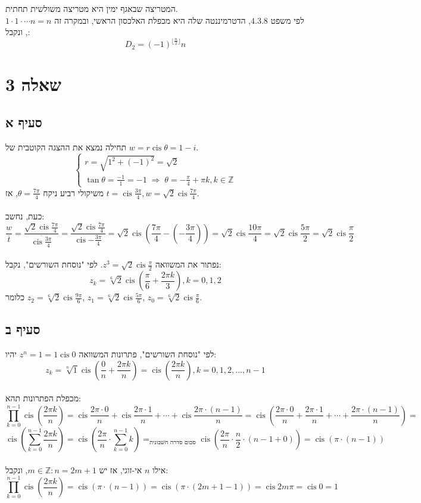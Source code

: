 \documentclass{article}
\DeclareMathOperator*{\equals}{=}
\DeclareMathOperator\cis{cis}
\begin{document}
המטריצה שבאגף ימין היא מטריצה משולשית תחתית. \\
לפי משפט $4.3.8$,
הדטרמיננטה שלה היא מכפלת האלכסון הראשי, ובמקרה זה $1\cdot 1 \cdot \cdots n=n$,
ונקבל:
\[
    D_2 = (-1)^{\lfloor \frac n 2 \rfloor}n
\]

\pagebreak

\section*{שאלה 3}

\subsection*{סעיף א}

תחילה נמצא את ההצגה הקוטבית של $w=r\cis{} \theta = 1-i$.
\[
    \begin{cases}
        r = \sqrt{1^2 + (-1)^2}=\sqrt{2} \\
        \tan \theta = \frac{-1}{1} = -1 \; \Rightarrow \; \theta = -\frac{\pi}{4} + \pi k, k \in \mathbb{Z}
    \end{cases}
\]
משיקולי רביע ניקח $\theta = \frac{7\pi}{4}$,
אז $t=\cis \frac{3\pi}{4}, w=\sqrt{2} \cis \frac{7\pi}{4}$. \\
\\
כעת, נחשב:
\[
    \frac{w}{\overline{t}} =
    \frac{\sqrt{2}\cis \frac{7\pi}{4}}{\overline{\cis{\frac{3\pi}{4}}}} =
    \frac{\sqrt{2}\cis \frac{7\pi}{4}}{\cis{-\frac{3\pi}{4}}} =
    \sqrt{2} \cis{(\frac{7\pi}{4} - (-\frac{3\pi}{4}))} =
    \sqrt{2} \cis{\frac{10\pi}{4}} =
    \sqrt{2} \cis{\frac{5\pi}{2}} =
    \sqrt{2} \cis{\frac{\pi}{2}}
\]
\\
נפתור את המשוואה $z^3=\sqrt{2} \cis{\frac{\pi}{2}}$.
לפי "נוסחת השורשים", נקבל:
\[
    z_k=\sqrt[6]{2} \cis{(\frac{\pi}{6}+\frac{2\pi k}{3})}, k=0,1,2
\]
כלומר
$z_2=\sqrt[6]{2} \cis{\frac{9\pi}{6}}$,
$z_1=\sqrt[6]{2} \cis{\frac{5\pi}{6}}$,
$z_0=\sqrt[6]{2} \cis{\frac{\pi}{6}}$.

\subsection*{סעיף ב}

לפי "נוסחת השורשים", פתרונות המשוואה $z^n=1=1\cis{0}$ יהיו:
\[
    z_k=\sqrt[n]{1} \cis{(\frac{0}{n} + \frac{2\pi k}{n})} =
    \cis{(\frac{2\pi k}{n})},
    k = 0, 1, 2, ..., n-1
\]
\\
מכפלת הפתרונות תהא:
\[
    \prod_{k=0}^{n-1} \cis{(\frac{2\pi k}{n})} =
    \cis{\frac{2\pi\cdot 0}{n}} + \cis{\frac{2\pi\cdot 1}{n}} + \cdots + \cis{\frac{2\pi\cdot (n-1)}{n}} =
    \cis{(\frac{2\pi\cdot 0}{n} + \frac{2\pi\cdot 1}{n} + \cdots + \frac{2\pi\cdot (n-1)}{n})} =
\]
\[
    \cis{(\sum_{k=0}^{n-1}\frac{2\pi k}{n})} =
    \cis{(\frac{2\pi}{n} \cdot \sum_{k=0}^{n-1}k)} \equals_{\text{סכום סדרה חשבונית}}
    \cis{(\frac{2\pi}{n} \cdot \frac{n}{2} \cdot (n-1+0))} =
    \cis{(\pi \cdot (n-1))}
\]
\\
אילו $n$ אי-זוגי,
אז יש $m\in \mathbb{Z}: n=2m+1$,
ונקבל:
\[
    \prod_{k=0}^{n-1} \cis{(\frac{2\pi k}{n})} =
    \cis{(\pi \cdot (n-1))} =
    \cis{(\pi \cdot (2m+1-1))} =
    \cis{2m\pi} = \cis{0}=1
\]
\end{document}
